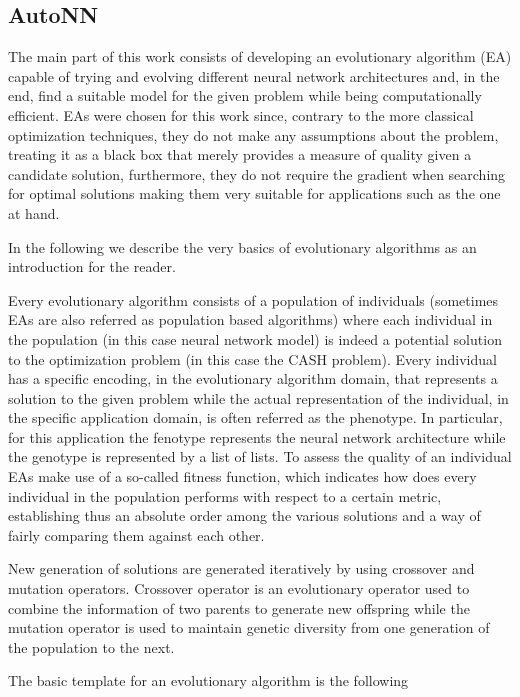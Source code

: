 \documentclass[journal]{IEEEtran}
\begin{document}
\subsection{AutoNN}

The main part of this work consists of developing an evolutionary algorithm (EA) capable of trying and evolving different neural network architectures and, in the end, find a suitable model for the given problem while being computationally efficient. EAs were chosen for this work since, contrary to the more classical optimization techniques, they do not make any assumptions about the problem, treating it as a black box that merely provides a measure of quality given a candidate solution,  furthermore, they do not require the gradient when searching for optimal solutions making them very suitable for applications such as the one at hand.

In the following we describe the very basics of evolutionary algorithms as an introduction for the reader. 

Every evolutionary algorithm consists of a population of individuals (sometimes EAs are also referred as population based algorithms) where each individual in the population (in this case neural network model) is indeed a potential solution to the optimization problem (in this case the CASH problem). Every individual has a specific encoding, in the evolutionary algorithm domain, that represents a solution to the given problem while the actual representation of the individual, in the specific application domain, is often referred as the phenotype. In particular, for this application  the fenotype represents the neural network architecture while the genotype is represented by a list of lists. To assess the quality of an individual EAs make use of a so-called fitness function, which indicates how does every individual in the population performs with respect to a certain metric, establishing thus an absolute order among the various solutions and a way of fairly comparing them against each other. 

New generation of solutions are generated iteratively by using crossover and mutation operators. Crossover operator is an evolutionary operator used to combine the information of two parents to generate new offspring while the mutation operator is used to maintain genetic diversity from one generation of the population to the next.

The basic template for an evolutionary algorithm is the following
\end{document}
